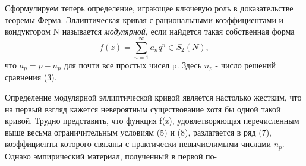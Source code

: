 \documentclass[a4paper]{article}
\begin{document}
\begin{multicols}{3}
Сформулируем теперь определение, играющее ключевую роль в доказательстве теоремы Ферма. Эллиптическая кривая с рациональными коэффициентами и кондуктором N называется \textit{модулярной}, если найдется такая собственная форма
\begin{equation}
    f(z)=\sum^\infty_{n=1}a_nq^n \in S_2(N),
\end{equation}
что \(a_p = p - n_p\) для почти все простых чисел p. Здесь $n_p$ - число решений сравнения (3).
\begin{center}
    \large\bfseries{}
\end{center}
Определение модулярной эллиптической кривой является настолько жестким, что на первый взгляд кажется невероятным существование хотя бы одной такой кривой. Трудно представить, что функция f(z), удовлетворяющая перечисленным выше весьма ограничительным условиям (5) и (8), разлагается в ряд (7), коэффициенты которого связаны с практически невычислимыми числами $n_p$. Однако эмпирический
материал, полученный в первой по-
\end{multicols}
\end{document}
